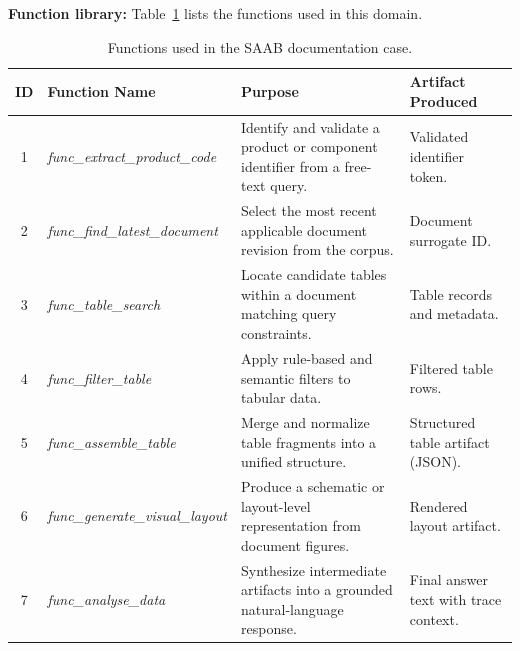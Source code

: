 \documentclass[largeformat]{interact}
\begin{document}

\noindent \textbf{Function library:}
Table~\ref{tab:saab_function_library} lists the functions used in this domain.

\begin{table}[!htbp]
\captionsetup{width=0.92\linewidth, skip=2pt}
    \caption{Functions used in the SAAB documentation case.}
    \label{tab:saab_function_library}
    \centering
    \small
    \setlength{\tabcolsep}{5pt}
    \renewcommand{\arraystretch}{1.1}
    \begin{tabularx}{\textwidth}{c >{\raggedright\arraybackslash}p{4.2cm} p{6.0cm} X}
    \toprule
    \textbf{ID} &
    \textbf{Function Name} &
    \textbf{Purpose} &
    \textbf{Artifact Produced} \\
    \midrule
    1 & \textit{func\_extract\_product\_code} &
    Identify and validate a product or component identifier from a free-text query. &
    Validated identifier token. \\
    \midrule
    2 & \textit{func\_find\_latest\_document} &
    Select the most recent applicable document revision from the corpus. &
    Document surrogate ID. \\
    \midrule
    3 & \textit{func\_table\_search} &
    Locate candidate tables within a document matching query constraints. &
    Table records and metadata. \\
    \midrule
    4 & \textit{func\_filter\_table} &
    Apply rule-based and semantic filters to tabular data. &
    Filtered table rows. \\
    \midrule
    5 & \textit{func\_assemble\_table} &
    Merge and normalize table fragments into a unified structure. &
    Structured table artifact (JSON). \\
    \midrule
    6 & \textit{func\_generate\_visual\_layout }&
    Produce a schematic or layout-level representation from document figures. &
    Rendered layout artifact. \\
    \midrule
    7 & \textit{func\_analyse\_data }&
    Synthesize intermediate artifacts into a grounded natural-language response. &
    Final answer text with trace context. \\
    \bottomrule
    \end{tabularx}
\end{table}
\end{document}
